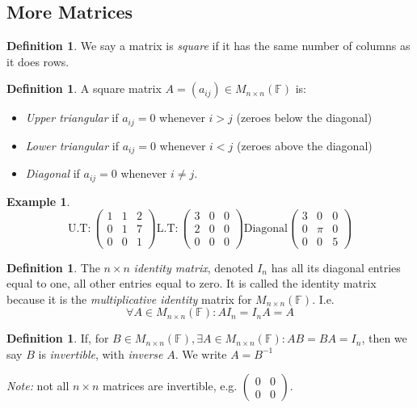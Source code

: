 \documentclass{report}
\theoremstyle{remark}
\theoremstyle{definition}
\newtheorem{definition}[theorem]{Definition}
\theoremstyle{definition}
\newtheorem{example}[theorem]{Example}
\theoremstyle{theorem}
\begin{document}
\subsection{More Matrices}
\begin{definition} We say a matrix is \emph{square} if it has the same number of columns as it does rows.
\end{definition}
\begin{definition}
A square matrix $A = (a_{ij}) \in M_{n \times n}(\mathbb{F})$ is:
\begin{itemize}
\item \emph{Upper triangular} if $a_{ij}=0 $ whenever $i>j$ (zeroes below the diagonal)
\item \emph{Lower triangular} if $a_{ij}=0$ whenever $i<j$ (zeroes above the diagonal)
\item \emph{Diagonal} if $a_{ij}=0$ whenever $i \neq j$.
\end{itemize}
\end{definition}
\begin{example}
\[ \text{U.T}: \begin{pmatrix}
1&1&2\\
0&1&7\\
0&0&1 \end{pmatrix}
\text{L.T}: \begin{pmatrix}
3&0&0\\
2&0&0\\
0&0&0 \end{pmatrix}
\text{Diagonal} \begin{pmatrix}
3&0&0\\
0&\pi&0\\
0&0&5 \end{pmatrix}
\]
\end{example}
\begin{definition}
The $n \times n$ \emph{identity matrix}, denoted $I_n$ has all its diagonal entries equal to one, all other entries equal to zero. It is called the identity matrix because it is the \emph{multiplicative identity} matrix for $M_{n \times n}(\mathbb{F})$. I.e.
\[ \forall A \in M_{n \times n}(\mathbb{F}): AI_n = I_nA = A\]
\end{definition}
\begin{definition}
If, for $B \in M_{n \times n}(\mathbb{F}), \exists A \in M_{n \times n}(\mathbb{F}): AB=BA=I_n$, then we say $B$ is \emph{invertible}, with \emph{inverse} $A$. We write $A=B^{-1}$
\end{definition}
\emph{Note:} not all $n \times n$ matrices are invertible, e.g. $\begin{pmatrix}0&0\\0&0\end{pmatrix}$.
\end{document}
